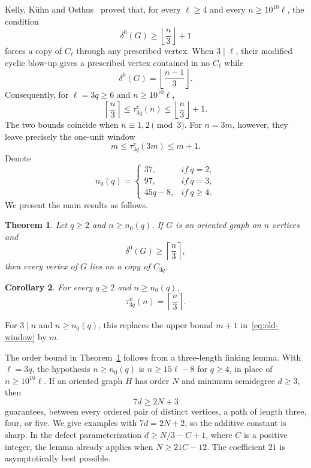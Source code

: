 \documentclass[11pt]{amsart}
\newtheorem{theorem}{Theorem}[section]
\newtheorem{corollary}[theorem]{Corollary}
\theoremstyle{definition}
\begin{document}
Kelly, K\"uhn and Osthus~\cite{KKO} proved that, for every $\ell\ge4$
and every $n\ge10^{10}\ell$, the condition
\[
  \delta^0(G)\ge \left\lfloor\frac n3\right\rfloor+1
\]
forces a copy of $C_\ell$ through any prescribed vertex.  When
$3\mid\ell$, their modified cyclic blow-up
\cite{KKO} gives a prescribed vertex
contained in no $C_\ell$ while
\[
  \delta^0(G)=\left\lfloor\frac{n-1}{3}\right\rfloor.
\]
Consequently, for $\ell=3q\ge6$ and $n\ge10^{10}\ell$,
\begin{equation}\label{eq:old-window}
  \left\lceil\frac n3\right\rceil
  \le \tau^v_{3q}(n)
  \le \left\lfloor\frac n3\right\rfloor+1.
\end{equation}
The two bounds coincide when $n\equiv1,2\pmod3$.  For $n=3m$,
however, they leave precisely the one-unit window
\[
  m\le \tau^v_{3q}(3m)\le m+1.
\]
Denote
\begin{equation}\label{eq:n0-def}
  n_0(q)=
  \begin{cases}
    37,&if~q=2,\\
    97,&if~q=3,\\
    45q-8,&if~q\ge4.
  \end{cases}
\end{equation}
We present the main results as follows.
\begin{theorem}\label{thm:main}
Let $q\ge2$ and $n\ge n_0(q)$.  If $G$ is an oriented graph on $n$ vertices and
\[
  \delta^0(G)\ge \left\lceil\frac n3\right\rceil,
\]
then every vertex of $G$ lies on a copy of $C_{3q}$.
\end{theorem}

\begin{corollary}\label{cor:threshold}
For every $q\ge2$ and $n\ge n_0(q)$,
\[
  \tau^v_{3q}(n)=\left\lceil\frac n3\right\rceil.
\]
\end{corollary}

For $3\mid n$ and $n\ge n_0(q)$, this replaces the upper bound
$m+1$ in~\eqref{eq:old-window} by $m$.

The order bound in Theorem~\ref{thm:main} follows from a three-length
linking lemma.  With $\ell=3q$, the hypothesis $n\ge n_0(q)$ is
$n\ge15\ell-8$ for $q\ge4$, in place of $n\ge10^{10}\ell$.
If an oriented graph $H$ has order $N$ and minimum semidegree $d\ge3$,
then
\[
  7d\ge2N+3
\]
guarantees, between every ordered pair of distinct vertices, a path of
length three, four, or five.  We give examples with
$7d=2N+2$, so the additive constant is sharp.  In the defect
parameterization $d\ge N/3-C+1$, where $C$ is a positive integer, the
lemma already applies when
$N\ge21C-12$. The coefficient $21$ is asymptotically best possible.
\end{document}
